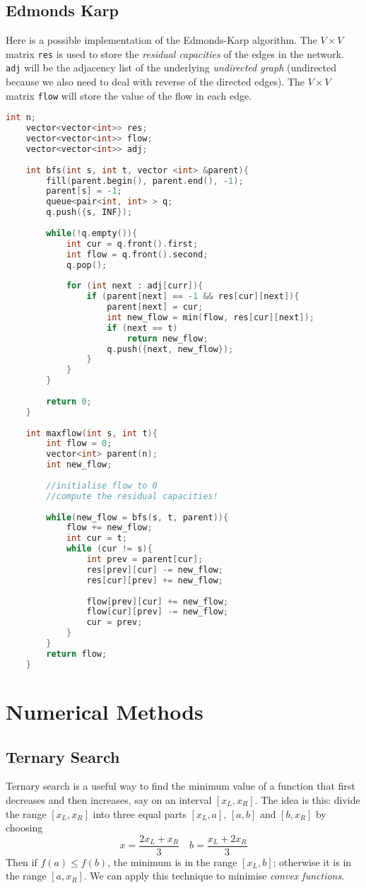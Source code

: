 \documentclass[12pt,a4paper]{amsart}
\numberwithin{equation}{section}
\theoremstyle{definition}
\begin{document}
\subsection{Edmonds Karp} Here is a possible implementation of the Edmonds-Karp algorithm. The $V\times V$ matrix \verb|res| is used to store the \textit{residual capacities} of the edges in the network. \verb|adj| will be the adjacency list of the underlying \textit{undirected graph} (undirected because we also need to deal with reverse of the directed edges). The $V\times V$ matrix \verb|flow| will store the value of the flow in each edge. 

\begin{lstlisting}[language=C++]
	int n;
	vector<vector<int>> res;
	vector<vector<int>> flow;
	vector<vector<int>> adj;
	
	int bfs(int s, int t, vector <int> &parent){
		fill(parent.begin(), parent.end(), -1);
		parent[s] = -1;
		queue<pair<int, int> > q;
		q.push({s, INF});
		
		while(!q.empty()){
			int cur = q.front().first;
			int flow = q.front().second;
			q.pop();
			
			for (int next : adj[curr]){
				if (parent[next] == -1 && res[cur][next]){
					parent[next] = cur;
					int new_flow = min(flow, res[cur][next]);
					if (next == t)
						return new_flow;
					q.push({next, new_flow});
				}
			}
		}
		
		return 0;
	}
	
	int maxflow(int s, int t){
		int flow = 0;
		vector<int> parent(n);
		int new_flow;
		
		//initialise flow to 0
		//compute the residual capacities!
		
		while(new_flow = bfs(s, t, parent)){
			flow += new_flow;
			int cur = t;
			while (cur != s){
				int prev = parent[cur];
				res[prev][cur] -= new_flow;
				res[cur][prev] += new_flow;
				
				flow[prev][cur] += new_flow;
				flow[cur][prev] -= new_flow;
				cur = prev;
			}
		}
		return flow;
	}
\end{lstlisting}

\section{Numerical Methods}

\subsection{Ternary Search} Ternary search is a useful way to find the minimum value of a function that first decreases and then increases, say on an interval $[x_L , x_R]$. The idea is this: divide the range $[x_L , x_R]$ into three equal parts $[x_L , a]$, $[a , b]$ and $[b , x_R]$ by choosing
$$x = \dfrac{2x_L + x_R}{3}\quad b = \dfrac{x_L + 2x_R}{3}$$
Then if $f(a) \le f(b)$, the minimum is in the range $[x_L , b]$; otherwise it is in the range $[a , x_R]$. We can apply this technique to minimise \textit{convex functions}.
\end{document}

